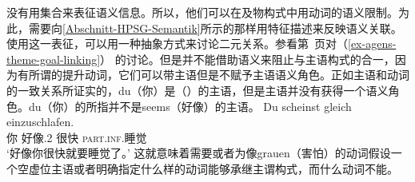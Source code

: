 \citet{MR2001a} 没有用集合来表征语义信息。所以，他们可以在及物构式中用动词的语义限制。为此，需要向\ref{Abschnitt-HPSG-Semantik}所示的那样用特征描述来反映语义关联。使用这一表征，可以用一种抽象方式来讨论二元关系。参看第~\pageref{ex-agens-theme-goal-linking}页对（\ref{ex-agens-theme-goal-linking}） 的讨论。但是并不能借助语义来阻止与主语构式的合一，因为有所谓的提升动词，它们可以带主语但是不赋予主语语义角色。正如主语和动词的一致关系所证实的，du（你）是（）的主语，但是主语并没有获得一个语义角色。du（你）的所指并不是seems（好像）的主语。
\ea
\gll Du scheinst gleich einzuschlafen.\\
     你 好像.2\sg{} 很快 \textsc{part}.\textsc{inf}.睡觉\\
\glt `好像你很快就要睡觉了。'
\z
这就意味着需要或者为像grauen（害怕）的动词假设一个空虚位主语或者明确指定什么样的动词能够承继主谓构式，而什么动词不能。

